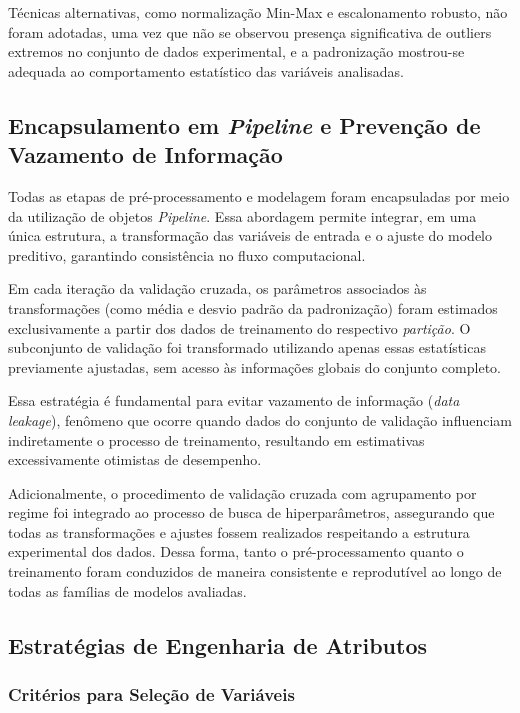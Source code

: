 Técnicas alternativas, como normalização Min-Max e escalonamento robusto, não foram adotadas, uma vez que não se observou presença significativa de outliers extremos no conjunto de dados experimental, e a padronização mostrou-se adequada ao comportamento estatístico das variáveis analisadas.
\subsection{Encapsulamento em \textit{Pipeline} e Prevenção de Vazamento de Informação}

Todas as etapas de pré-processamento e modelagem foram encapsuladas por meio da utilização de objetos \textit{Pipeline}. Essa abordagem permite integrar, em uma única estrutura, a transformação das variáveis de entrada e o ajuste do modelo preditivo, garantindo consistência no fluxo computacional.

Em cada iteração da validação cruzada, os parâmetros associados às transformações (como média e desvio padrão da padronização) foram estimados exclusivamente a partir dos dados de treinamento do respectivo \textit{partição}. O subconjunto de validação foi transformado utilizando apenas essas estatísticas previamente ajustadas, sem acesso às informações globais do conjunto completo.

Essa estratégia é fundamental para evitar vazamento de informação (\textit{data leakage}), fenômeno que ocorre quando dados do conjunto de validação influenciam indiretamente o processo de treinamento, resultando em estimativas excessivamente otimistas de desempenho.

Adicionalmente, o procedimento de validação cruzada com agrupamento por regime foi integrado ao processo de busca de hiperparâmetros, assegurando que todas as transformações e ajustes fossem realizados respeitando a estrutura experimental dos dados. Dessa forma, tanto o pré-processamento quanto o treinamento foram conduzidos de maneira consistente e reprodutível ao longo de todas as famílias de modelos avaliadas.


\subsection{Estratégias de Engenharia de Atributos}

\subsubsection{Critérios para Seleção de Variáveis}

